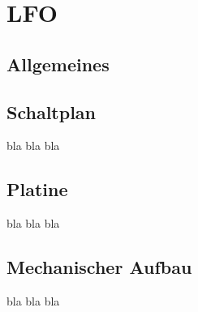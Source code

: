 \chapter{LFO}
\label{ch:concept}
\section{Allgemeines}


\section{Schaltplan}
bla bla bla

\section{Platine}
bla bla bla

\section{Mechanischer Aufbau}
bla bla bla